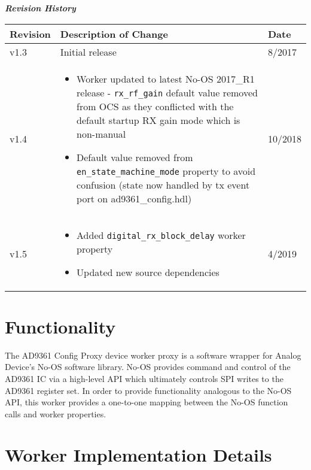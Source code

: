 \documentclass{article}
\def\Comp{AD9361 Config Proxy}
\begin{document}
	\begin{center}
	\textit{\textbf{Revision History}}
		\begin{table}[H]
		\label{table:revisions} %
      \begin{longtable}{|p{}
                        |p{}
                        |p{}|}
			\hline
			\rowcolor{blue}
			\textbf{Revision} & \textbf{Description of Change} & \textbf{Date} \\
		    \hline
		    v1.3 & Initial release & 8/2017 \\
		    \hline
        v1.4 & \begin{itemize} \item Worker updated to latest No-OS 2017\_R1 release - \verb+rx_rf_gain+ default value removed from OCS as they conflicted with the default startup RX gain mode which is non-manual \item Default value removed from \verb+en_state_machine_mode+ property to avoid confusion (state now handled by tx event port on ad9361\_config.hdl) \end{itemize} & 10/2018 \\
		    \hline
		    v1.5 & \begin{itemize} \item Added \verb+digital_rx_block_delay+ worker property \item Updated new source dependencies \end{itemize} & 4/2019 \\
		    \hline
			\end{longtable}
		\end{table}
	\end{center}

\section*{Functionality}
	The \Comp{} device worker proxy is a software wrapper for Analog Device's No-OS software library\cite{no_os}. No-OS provides command and control of the AD9361 IC\cite{ad9361} via a high-level API which ultimately controls SPI writes to the AD9361 register set. In order to provide functionality analogous to the No-OS API, this worker provides a one-to-one mapping between the No-OS function calls and worker properties.
\section*{Worker Implementation Details}
\end{document}
